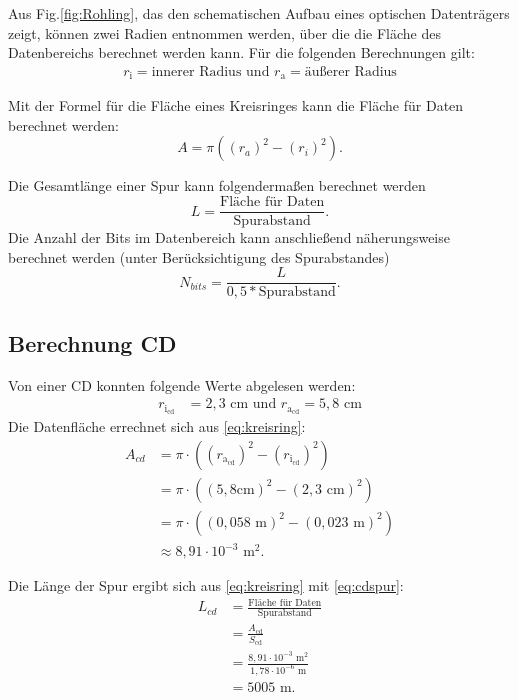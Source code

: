\documentclass[9pt,twocolumn,twoside]{pnas-new}
\begin{document}
Aus Fig.\ref{fig:Rohling}, das den schematischen Aufbau eines optischen Datenträgers zeigt, können zwei Radien entnommen werden, über die die Fläche des Datenbereichs berechnet werden kann.
Für die folgenden Berechnungen gilt: \begin{align*} r_{\mbox{i}}  = \mbox{innerer Radius und } r_{\mbox{a}} = \mbox{äußerer Radius} \end{align*} 


Mit der Formel für die Fläche eines Kreisringes \cite[Seite 147]{Bartsch2014} kann die Fläche für Daten berechnet werden: \begin{equation} \label{eq:kreisring} A = \pi((r_a)^2-(r_i)^2).  \end{equation}

Die Gesamtlänge einer Spur kann folgendermaßen berechnet werden \begin{equation} \label{eq:gesamtlänge} L = \frac{\mbox{Fläche für Daten}}{\mbox{Spurabstand}}. \end{equation}
Die Anzahl der Bits im Datenbereich kann anschließend näherungsweise berechnet werden (unter Berücksichtigung des Spurabstandes) \begin{equation} \label{eq:bitanzahl} N_{bits} = \frac{L}{0,5*\mbox{Spurabstand}}. \end{equation}

\subsection{Berechnung CD}
Von einer CD konnten folgende Werte abgelesen werden:
\begin{align*}
 r_{\mbox{i}_{\mbox{cd}}} &= 2,3 \mbox{ cm und } r_{\mbox{a}_{\mbox{cd}}} = 5,8 \mbox{ cm}
 \end{align*} 
\indent Die Datenfläche errechnet sich aus \eqref{eq:kreisring}:
\begin{align*}
 A_{cd} &= \pi\cdot((r_{\mbox{a}_{\mbox{cd}}})^2-(r_{\mbox{i}_{\mbox{cd}}})^2)\\	
&= \pi\cdot((5,8\mbox{cm})^2-(2,3\mbox{ cm})^2) \\
 &=  \pi\cdot((0,058\mbox{ m})^2-(0,023\mbox{ m})^2) \\
 &\approx  8,91\cdot10^{-3}\mbox{ m}^2.
\end{align*}

Die Länge der Spur ergibt sich aus \eqref{eq:kreisring} mit \eqref{eq:cdspur}:
\begin{align*}
 L_{cd} &= \frac{\mbox{Fläche für Daten}}{\mbox{Spurabstand}}\\
 &= \frac{A_{\mbox{cd}}}{S_{\mbox{cd}}}\\
 &= \frac{8,91\cdot10^{-3}\mbox{ m}^2}{1,78\cdot10^{-6}\mbox{ m} }\\
 &= 5005\mbox{ m}.
\end{align*}
\end{document}
